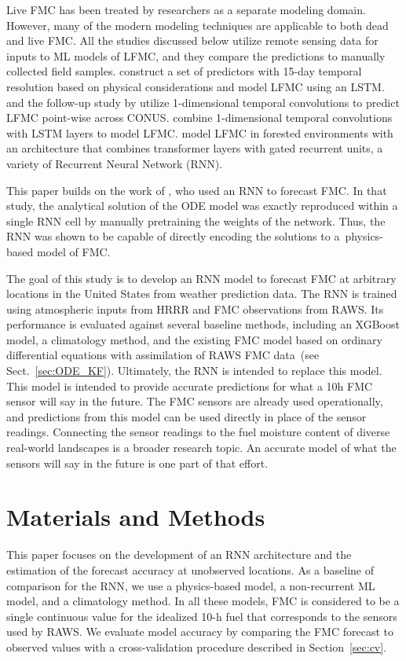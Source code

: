 \documentclass[fire,article,submit,pdftex,moreauthors]{Definitions/mdpi}
\begin{document}
Live FMC has been treated by researchers as a separate modeling domain. However, many of the modern modeling techniques are applicable to both dead and live FMC. All the studies discussed below utilize remote sensing data for inputs to ML models of LFMC, and they compare the predictions to manually collected field samples. \citet{Rao-2020-SEM} construct a set of predictors with 15-day temporal resolution based on physical considerations and model LFMC using an LSTM. \citet{Zhu-2021-LFM} and the follow-up study by \citet{Miller-2023-PLF} utilize 1-dimensional temporal convolutions to predict LFMC point-wise across CONUS. \citet{Xie-2022-RLF} combine 1-dimensional temporal convolutions with LSTM layers to model LFMC. \citet{Wang-2025-NAI} model LFMC in forested environments with an architecture that combines transformer layers with gated recurrent units, a variety of Recurrent Neural Network (RNN).

This paper builds on the work of \citet{Mandel-2023-BFM}, who used an RNN to forecast FMC. In that study, the analytical solution of the ODE model was exactly reproduced within a single RNN cell by manually pretraining the weights of the network. Thus, the RNN was shown to be capable of directly encoding the solutions to a~physics-based model of FMC.

The goal of this study is to develop an RNN model to forecast FMC at arbitrary locations in the United States from weather prediction data. The RNN is trained using atmospheric inputs from HRRR and FMC observations from RAWS. Its performance is evaluated against several baseline methods, including an XGBoost model, a climatology method, and the existing FMC model based on ordinary differential equations with assimilation of RAWS FMC data~\citep{Vejmelka-2014-DAF,Vejmelka-2016-DAD}(see Sect.~\ref{sec:ODE_KF}). Ultimately, the RNN is intended to replace this model. This model is intended to provide accurate predictions for what a 10h FMC sensor will say in the future. The FMC sensors are already used operationally, and predictions from this model can be used directly in place of the sensor readings. Connecting the sensor readings to the fuel moisture content of diverse real-world landscapes is a broader research topic. An accurate model of what the sensors will say in the future is one part of that effort.

\section{Materials and Methods}
This paper focuses on the development of an RNN architecture and the estimation of the forecast accuracy at unobserved locations. As a baseline of comparison for the RNN, we use a physics-based model, a non-recurrent ML model, and a climatology method. In all these models, FMC is considered to be a single continuous value for the idealized 10-h fuel that corresponds to the sensors used by RAWS. We evaluate model accuracy by comparing the FMC forecast to observed values with a cross-validation procedure described in Section~\ref{sec:cv}. 
\end{document}
